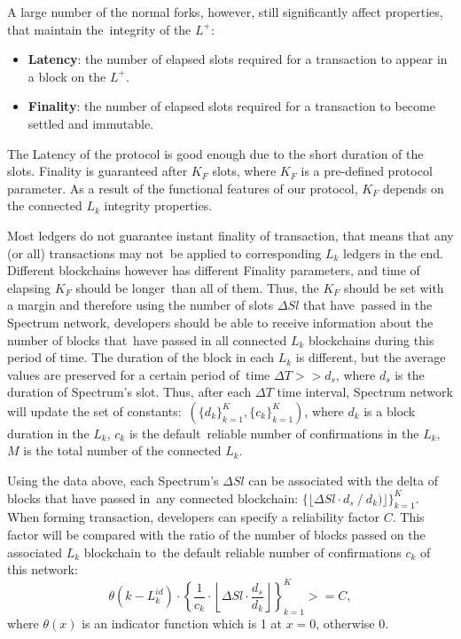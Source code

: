 A large number of the normal forks, however, still significantly affect properties, that maintain the\
integrity of the $L^+$:
\begin{itemize}
    \item \textbf{Latency}: the number of elapsed slots required for a transaction to appear in a block on the $L^+$.
    \item \textbf{Finality}: the number of elapsed slots required for a transaction to become settled and immutable.
\end{itemize}
The Latency of the protocol is good enough due to the short duration of the slots.
Finality is guaranteed after $K_F$ slots, where $K_F$ is a pre-defined protocol parameter.
As a result of the functional features of our protocol, $K_F$ depends on the connected $L_k$ integrity properties.

Most ledgers do not guarantee instant finality of transaction, that means that any (or all) transactions may not\
be applied to corresponding $L_k$ ledgers in the end.
Different blockchains however has different Finality parameters, and time of elapsing $K_F$ should be longer\
than all of them.
Thus, the $K_F$ should be set with a margin and therefore using the number of slots $\Delta Sl$ that have\
passed in the Spectrum network, developers should be able to receive information about the number of blocks that\
have passed in all connected $L_k$ blockchains during this period of time.
The duration of the block in each $L_k$ is different, but the average values are preserved for a certain period of\
time ${\Delta T >> d_s}$, where $d_s$ is the duration of Spectrum's slot.
Thus, after each $\Delta T$ time interval, Spectrum network will update the set of constants:\
${(\{d_{k}\}_{k=1}^{K},\{c_{k}\}_{k=1}^{K})}$, where $d_k$ is a block duration in the $L_k$, $c_k$ is the default\
reliable number of confirmations in the $L_k$, $M$ is the total number of the connected $L_k$.

Using the data above, each Spectrum's $\Delta Sl$ can be associated with the delta of blocks that have passed in\
any connected blockchain: ${\{\lfloor \Delta Sl \cdot d_s \mathbin{/} d_k)\rfloor\}_{k=1}^{K}}$.
When forming transaction, developers can specify a reliability factor $C$.
This factor will be compared with the ratio of the number of blocks passed on the associated $L_k$ blockchain to\
the default reliable number of confirmations $c_k$ of this network:
\begin{equation}
    \theta(k-L_k^{id})\cdot \left\{\frac{1}{c_k} \cdot \left\lfloor \Delta Sl \cdot
    \frac{d_s}{d_k}\right\rfloor\right\}_{k=1}^{K} >= C,\label{eq:equation2}
\end{equation}
where $\theta(x)$ is an indicator function which is 1 at $x = 0$, otherwise 0.
